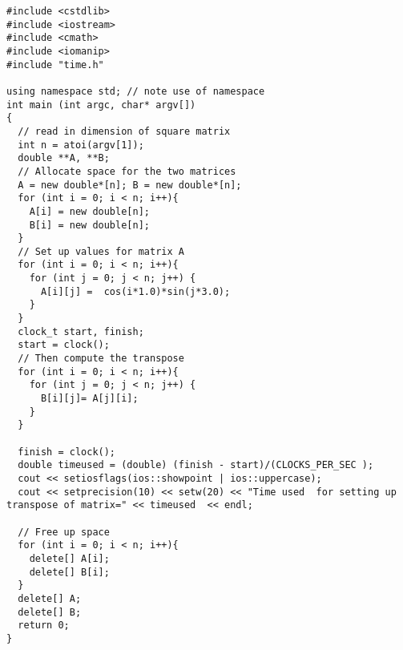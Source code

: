 \documentclass[%
oneside,                 %
final,                   %
10pt]{article}
\begin{document}
\begin{Verbatim}[numbers=none,fontsize=\fontsize{9pt}{9pt},baselinestretch=0.95]
#include <cstdlib>
#include <iostream>
#include <cmath>
#include <iomanip>
#include "time.h"

using namespace std; // note use of namespace
int main (int argc, char* argv[])
{
  // read in dimension of square matrix
  int n = atoi(argv[1]);
  double **A, **B;
  // Allocate space for the two matrices
  A = new double*[n]; B = new double*[n];
  for (int i = 0; i < n; i++){
    A[i] = new double[n];
    B[i] = new double[n];
  }
  // Set up values for matrix A
  for (int i = 0; i < n; i++){
    for (int j = 0; j < n; j++) {
      A[i][j] =  cos(i*1.0)*sin(j*3.0);
    }
  }
  clock_t start, finish;
  start = clock();
  // Then compute the transpose
  for (int i = 0; i < n; i++){
    for (int j = 0; j < n; j++) {
      B[i][j]= A[j][i];
    }
  }

  finish = clock();
  double timeused = (double) (finish - start)/(CLOCKS_PER_SEC );
  cout << setiosflags(ios::showpoint | ios::uppercase);
  cout << setprecision(10) << setw(20) << "Time used  for setting up transpose of matrix=" << timeused  << endl;

  // Free up space
  for (int i = 0; i < n; i++){
    delete[] A[i];
    delete[] B[i];
  }
  delete[] A;
  delete[] B;
  return 0;
}


\end{Verbatim}


\end{document}
